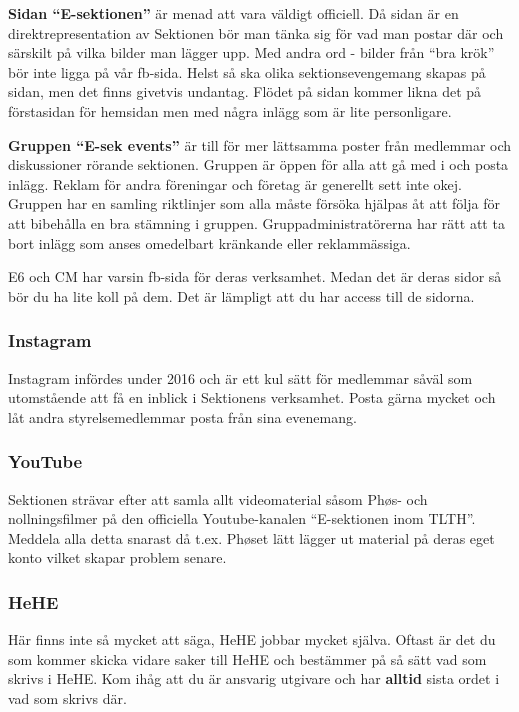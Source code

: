 \documentclass[10pt]{article}
\begin{document}
\textbf{Sidan ``E-sektionen''} är menad att vara väldigt officiell. Då sidan är en direktrepresentation av Sektionen bör man tänka sig för vad man postar där och särskilt på vilka bilder man lägger upp. Med andra ord - bilder från ``bra krök'' bör inte ligga på vår fb-sida. Helst så ska olika sektionsevengemang skapas på sidan, men det finns givetvis undantag. Flödet på sidan kommer likna det på förstasidan för hemsidan men med några inlägg som är lite personligare.

\textbf{Gruppen ``E-sek events''} är till för mer lättsamma poster från medlemmar och diskussioner rörande sektionen. Gruppen är öppen för alla att gå med i och posta inlägg. Reklam för andra föreningar och företag är generellt sett inte okej. Gruppen har en samling riktlinjer som alla måste försöka hjälpas åt att följa för att bibehålla en bra stämning i gruppen. Gruppadministratörerna har rätt att ta bort inlägg som anses omedelbart kränkande eller reklammässiga.

E6 och CM har varsin fb-sida för deras verksamhet. Medan det är deras sidor så bör du ha lite koll på dem. Det är lämpligt att du har access till de sidorna.

\subsubsection{Instagram}
Instagram infördes under 2016 och är ett kul sätt för medlemmar såväl som utomstående att få en inblick i Sektionens verksamhet. Posta gärna mycket och låt andra styrelsemedlemmar posta från sina evenemang.

\subsubsection{YouTube}
Sektionen strävar efter att samla allt videomaterial såsom Ph\o s- och nollningsfilmer på den officiella Youtube-kanalen ``E-sektionen inom TLTH''. Meddela alla detta snarast då t.ex. Ph\o set lätt lägger ut material på deras eget konto vilket skapar problem senare.

\subsubsection{HeHE}
Här finns inte så mycket att säga, HeHE jobbar mycket själva. Oftast är det du som kommer skicka vidare saker till HeHE och bestämmer på så sätt vad som skrivs i HeHE. Kom ihåg att du är ansvarig utgivare och har \textbf{alltid} sista ordet i vad som skrivs där.
\end{document}
